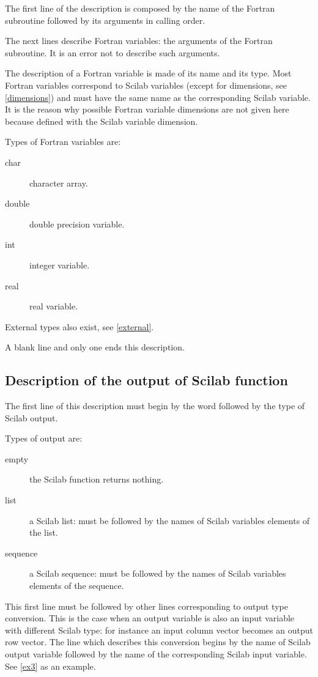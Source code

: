 The first line of the description is composed by the name of the 
Fortran subroutine
followed by its arguments in calling order.

The next lines describe Fortran variables: the arguments of the Fortran
subroutine. 
It is an error not to describe such arguments.

The description of a Fortran variable is made of its name and its type.
Most Fortran variables correspond to Scilab variables (except for
dimensions, see \ref{dimensions}) and must have the same name as the
corresponding Scilab variable. It is the reason why possible Fortran variable
dimensions are not given here because defined with the Scilab variable
dimension.

\smallskip

Types of Fortran variables are:
\begin{description}
  \item[char] character array.
  \item[double] double precision variable.
  \item[int] integer variable.
  \item[real] real variable.
\end{description}

External types also exist, see \ref{external}.

\smallskip

A blank line and only one ends this description.

\subsection{Description of the output of Scilab function}
\label{output}

The first line of this description must begin by the word  followed
by the type of Scilab output.

\smallskip

Types of output are:
\begin{description}
  \item[empty] the Scilab function returns nothing.
  \item[list] a Scilab list: must be followed by the names of Scilab variables
elements of the list.
  \item[sequence] a Scilab sequence: must be followed by the names of Scilab
variables elements of the sequence.
\end{description}

This first line must be followed by other lines corresponding to output type
conversion. This is the case when an output variable is also an input variable
with different Scilab type: for instance an input column vector becomes an
output row vector. The line which describes this conversion begins by the name
of Scilab output variable followed by the name of the corresponding Scilab input
variable. See \ref{ex3} as an example.
\medskip

